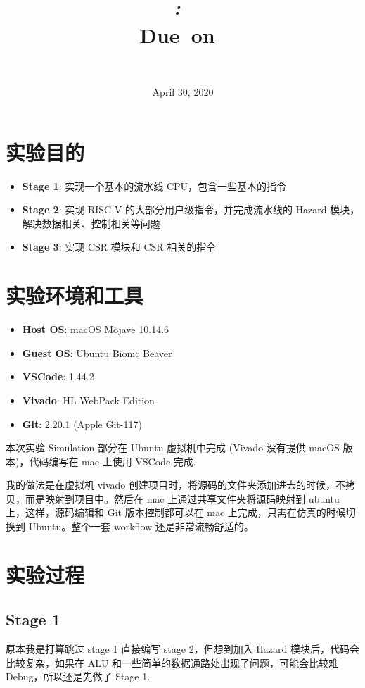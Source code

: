 \documentclass{article}
\title{
  \vspace{2in}
  \textbf{\reportMainTitle}\\
  \vspace{0.2in}
  \Large\textit{\reportClass:\ \reportTitle}\\
  \vspace{0.1in}
  \normalsize\vspace{0.1in}\small{Due\ on\ \reportDueTime}\\
  \vspace{3in}
}
\author{\reportAuthorName \\ \reportStudentNo}
\date{April 30, 2020}
\begin{document}
\maketitle

\pagebreak

\tableofcontents\label{toc}

\pagebreak

\newpage

\section{实验目的}

\begin{itemize}
  \item
    \textbf{Stage 1}: 实现一个基本的流水线 CPU，包含一些基本的指令
  \item
    \textbf{Stage 2}: 实现 RISC-V 的大部分用户级指令，并完成流水线的 Hazard 模块，解决数据相关、控制相关等问题
  \item
    \textbf{Stage 3}: 实现 CSR 模块和 CSR 相关的指令
\end{itemize}

\section{实验环境和工具}
\begin{itemize}
  \item
    \textbf{Host OS}: macOS Mojave 10.14.6
  \item
    \textbf{Guest OS}: Ubuntu Bionic Beaver
  \item
    \textbf{VSCode}: 1.44.2
  \item
    \textbf{Vivado}: HL WebPack Edition
  \item
    \textbf{Git}: 2.20.1 (Apple Git-117)
\end{itemize}
本次实验 Simulation 部分在 Ubuntu 虚拟机中完成 (Vivado 没有提供 macOS 版本)，代码编写在 mac 上使用 VSCode 完成.

我的做法是在虚拟机 vivado 创建项目时，将源码的文件夹添加进去的时候，不拷贝，而是映射到项目中。然后在 mac 上通过共享文件夹将源码映射到 ubuntu 上，这样，源码编辑和 Git 版本控制都可以在 mac 上完成，只需在仿真的时候切换到 Ubuntu。整个一套 workflow 还是非常流畅舒适的。
\section{实验过程}
\subsection{Stage 1}
原本我是打算跳过 stage 1 直接编写 stage 2，但想到加入 Hazard 模块后，代码会比较复杂，如果在 ALU 和一些简单的数据通路处出现了问题，可能会比较难 Debug，所以还是先做了 Stage 1.
\end{document}
